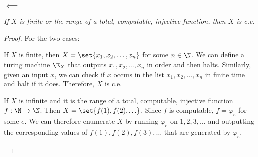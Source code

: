 \begin{problem}
\begin{answer}
    \subsubsection*{$\impliedby$}

    \emph{
      If $X$ is finite or the range of a total, computable, injective function,
      then $X$ is c.e.
    }
    
    \begin{proof}
      For the two cases:
      \begin{enumarabic}
        \item If $X$ is finite, then $X = \set{x_1, x_2, \ldots, x_n}$ for some $n \in \N$.
        We can define a turing machine $\E_X$ that outputs $x_1, x_2, \ldots, x_n$
        in order and then halts.
        Similarly, given an input $x$, we can check if $x$ occurs in the list
        $x_1, x_2, \ldots, x_n$ in finite time and halt if it does.
        Therefore, $X$ is c.e.

        \item If $X$ is infinite and it is the range of a
        total, computable, injective function $f: \N \to \N$.
        Then $X = \set{f(1), f(2), \ldots}$.
        Since $f$ is computable, $f = \varphi_{e}$ for some $e$.
        We can therefore enumerate $X$ by running $\varphi_e$
        on $1, 2, 3, \ldots$ and outputting the corresponding values
        of $f(1), f(2), f(3), \ldots$ that are generated by $\varphi_e$.
      \end{enumarabic}
    \end{proof}
  \end{answer}
\end{problem}
